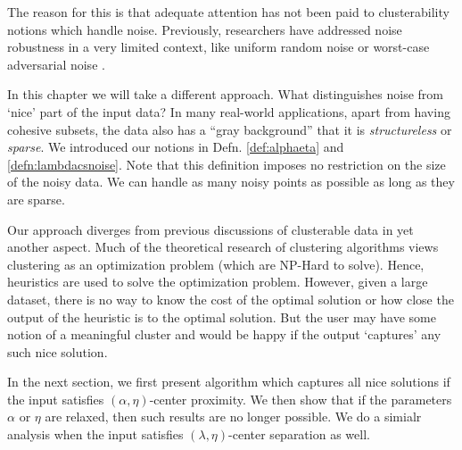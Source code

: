 \documentclass[letterpaper,12pt,titlepage,oneside,final]{book}
\begin{document}
The reason for this is that adequate attention has not been paid to clusterability notions which handle noise. Previously, researchers have addressed noise robustness in a very limited context, like uniform random noise or worst-case adversarial noise \cite{balcan2012clustering,ackerman2009clusterability}.

In this chapter we will take a different approach. What distinguishes noise from `nice' part of the input data? In many real-world applications, apart from having cohesive subsets, the data also has a ``gray background'' that it is \emph{structureless} or \emph{sparse}. We introduced our notions in Defn. \ref{def:alphaeta} and \ref{defn:lambdacsnoise}. Note that this definition imposes no restriction on the size of the noisy data.  We can handle as many noisy points as possible as long as they are sparse. 

Our approach diverges from previous discussions of clusterable data in yet another aspect. Much of the theoretical research of clustering algorithms views clustering as an optimization problem (which are NP-Hard to solve). Hence, heuristics are used to solve the optimization problem. However, given a large dataset, there is no way to know the cost of the optimal solution or how close the output of the heuristic is to the optimal solution. But the user may have some notion of a meaningful cluster and would be happy if the output `captures' any such nice solution. 

In the next section, we first present algorithm which captures all nice solutions if the input satisfies $(\alpha, \eta)$-center proximity. We then show that if the parameters $\alpha$ or $\eta$ are relaxed, then such results are no longer possible. We do a simialr analysis when the input satisfies $(\lambda, \eta)$-center separation as well.  
\end{document}
